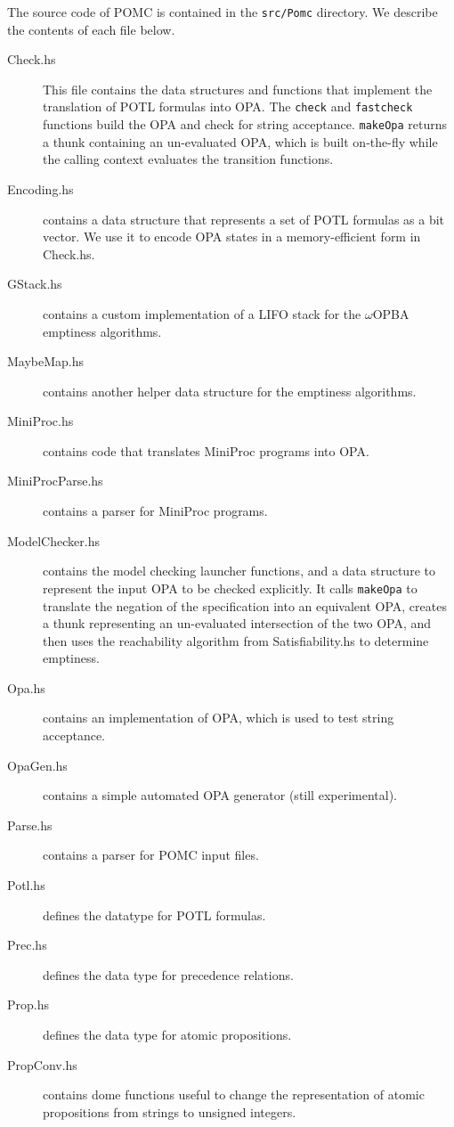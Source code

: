 \documentclass[9pt,a4paper]{article}
\begin{document}
The source code of POMC is contained in the \texttt{src/Pomc} directory.
We describe the contents of each file below.
\begin{description}
\item[Check.hs] This file contains the data structures and functions
  that implement the translation of POTL formulas into OPA.
  The \texttt{check} and \texttt{fastcheck} functions build the OPA
  and check for string acceptance. \texttt{makeOpa} returns
  a thunk containing an un-evaluated OPA, which is built on-the-fly
  while the calling context evaluates the transition functions.
\item[Encoding.hs] contains a data structure that represents a set of POTL
  formulas as a bit vector. We use it to encode OPA states in a
  memory-efficient form in Check.hs.
\item[GStack.hs] contains a custom implementation of a LIFO stack
  for the $\omega$OPBA emptiness algorithms.
\item[MaybeMap.hs] contains another helper data structure for the emptiness algorithms.
\item[MiniProc.hs] contains code that translates MiniProc programs into OPA.
\item[MiniProcParse.hs] contains a parser for MiniProc programs.
\item[ModelChecker.hs] contains the model checking launcher functions,
  and a data structure to represent the input OPA to be checked explicitly.
  It calls \texttt{makeOpa} to translate the negation of the specification
  into an equivalent OPA, creates a thunk representing an un-evaluated
  intersection of the two OPA, and then uses the reachability algorithm from
  Satisfiability.hs to determine emptiness.
\item[Opa.hs] contains an implementation of OPA, which is used to test
  string acceptance.
\item[OpaGen.hs] contains a simple automated OPA generator (still experimental).
\item[Parse.hs] contains a parser for POMC input files.
\item[Potl.hs] defines the datatype for POTL formulas.
\item[Prec.hs] defines the data type for precedence relations.
\item[Prop.hs] defines the data type for atomic propositions.
\item[PropConv.hs] contains dome functions useful to change the representation
  of atomic propositions from strings to unsigned integers.

\end{description}
\end{document}
